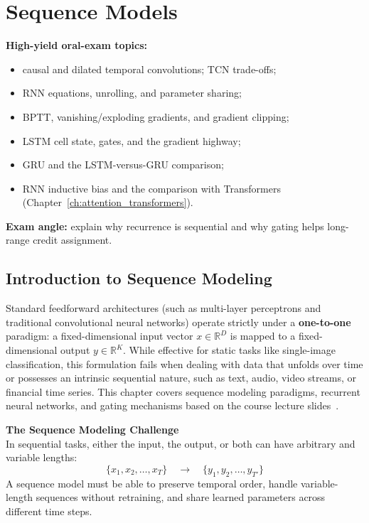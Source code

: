 \newpage

\chapter{Sequence Models}\label{ch:sequence_models}

\begin{ExamFocusBox}
\textbf{High-yield oral-exam topics:}
\begin{itemize}[nosep, leftmargin=*]
    \item causal and dilated temporal convolutions; TCN trade-offs;
    \item RNN equations, unrolling, and parameter sharing;
    \item BPTT, vanishing/exploding gradients, and gradient clipping;
    \item LSTM cell state, gates, and the gradient highway;
    \item GRU and the LSTM-versus-GRU comparison;
    \item RNN inductive bias and the comparison with Transformers (Chapter~\ref{ch:attention_transformers}).
\end{itemize}
\textbf{Exam angle:} explain why recurrence is sequential and why gating helps long-range credit assignment.
\end{ExamFocusBox}


\section{Introduction to Sequence Modeling}

Standard feedforward architectures (such as multi-layer perceptrons and traditional convolutional neural networks) operate strictly under a \textbf{one-to-one} paradigm: a fixed-dimensional input vector $x \in \mathbb{R}^D$ is mapped to a fixed-dimensional output $y \in \mathbb{R}^K$. While effective for static tasks like single-image classification, this formulation fails when dealing with data that unfolds over time or possesses an intrinsic sequential nature, such as text, audio, video streams, or financial time series. This chapter covers sequence modeling paradigms, recurrent neural networks, and gating mechanisms based on the course lecture slides~\cite{galasso2025seqmodels}.

\begin{keywordbox}
\textbf{The Sequence Modeling Challenge} \\
In sequential tasks, either the input, the output, or both can have arbitrary and variable lengths:
\[ \{x_1, x_2, \dots, x_T\} \quad \longrightarrow \quad \{y_1, y_2, \dots, y_{T'}\} \]
A sequence model must be able to preserve temporal order, handle variable-length sequences without retraining, and share learned parameters across different time steps.
\end{keywordbox}

